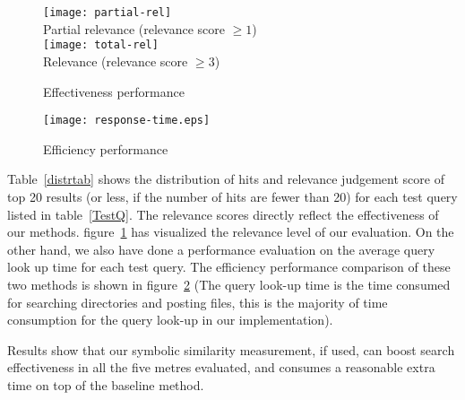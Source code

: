 \begin{figure}
\begin{center}
\texttt{[image: partial-rel]}
\\Partial relevance (relevance score $\ge 1$)
\\[0.4in]
\texttt{[image: total-rel]}
\\ Relevance (relevance score $\ge 3$)
\end{center}
\caption{Effectiveness performance}\label{perfcomp}
\end{figure}

\begin{figure}
\begin{center}
\texttt{[image: response-time.eps]}
\end{center}
\caption{Efficiency performance}\label{effiperf}
\end{figure}

Table~\ref{distrtab} shows the distribution of hits and relevance judgement score of top 20 results (or less, if the number of hits are fewer than 20) for each test query listed in table~\ref{TestQ}.
The relevance scores directly reflect the effectiveness of our methods.
figure~\ref{perfcomp} has visualized the relevance level of our evaluation.
On the other hand,
we also have done a performance evaluation on the average query look up time for each test query.
The efficiency performance comparison of these two methods is shown in figure~\ref{effiperf} 
(The query look-up time is the time consumed for searching directories and posting files, this is the majority of time consumption for the query look-up in our implementation).

Results show that our symbolic similarity measurement, if used, can boost search effectiveness in all the five metres evaluated, 
and consumes a reasonable extra time on top of the baseline method. 
